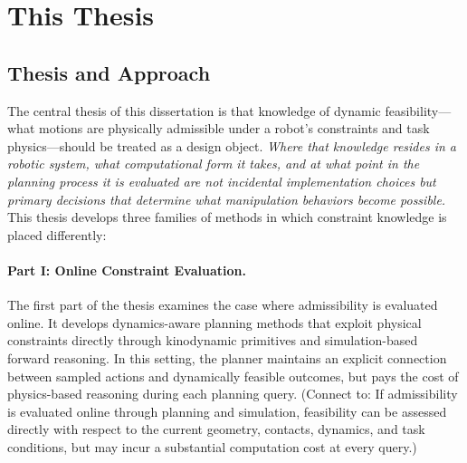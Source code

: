 \section{This Thesis}

\subsection{Thesis and Approach}
\label{sec:intro:statement}


The central thesis of this dissertation is that knowledge of dynamic feasibility---what motions are physically admissible under a robot's constraints and task physics---should be treated as a design object.
\textsl{Where that knowledge resides in a robotic system, what computational form it takes, and at what point in the planning process it is evaluated are not incidental implementation choices but primary decisions that determine what manipulation behaviors become possible.}
This thesis develops three families of methods in which constraint knowledge is placed differently:

\paragraph{Part I: Online Constraint Evaluation.}
The first part of the thesis examines the case where admissibility is evaluated online.
It develops dynamics-aware planning methods that exploit physical constraints directly through kinodynamic primitives and simulation-based forward reasoning.
In this setting, the planner maintains an explicit connection between sampled actions and dynamically feasible outcomes, but pays the cost of physics-based reasoning during each planning query. (Connect to: If admissibility is evaluated online through planning and simulation, feasibility can be assessed directly with respect to the current geometry, contacts, dynamics, and task conditions, but may incur a substantial computation cost at every query.)

